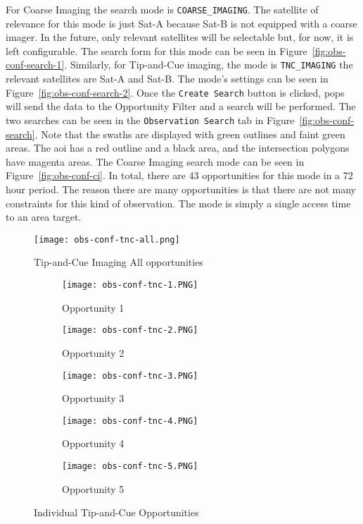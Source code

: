 For Coarse Imaging the search mode is \texttt{COARSE\_IMAGING}.  The satellite
of relevance for this mode is just Sat-A because Sat-B is not equipped with a
coarse imager. In the future, only relevant satellites will be selectable but,
for now, it is left configurable.  The search form for this mode can be seen in
Figure~\ref{fig:obs-conf-search-1}. Similarly, for Tip-and-Cue imaging, the
mode is \texttt{TNC\_IMAGING} the relevant satellites are Sat-A and Sat-B.  The
mode's settings can be seen in Figure~\ref{fig:obs-conf-search-2}. Once the
\texttt{Create Search} button is clicked, \gls{pops} will send the data to the
Opportunity Filter and a search will be performed. The two searches can be seen
in the \texttt{Observation Search} tab in Figure~\ref{fig:obs-conf-search}.
Note that the swaths are displayed with green outlines and faint green areas.
The \gls{aoi} has a red outline and a black area, and the intersection polygons
have magenta areas. The Coarse Imaging search mode can be seen in
Figure~\ref{fig:obs-conf-ci}. In total, there are 43 opportunities for this
mode in a 72 hour period. The reason there are many opportunities is that there
are not many constraints for this kind of observation. The mode is simply a
single access time to an area target. 

\begin{figure}[ht]
    \centering
    \texttt{[image: obs-conf-tnc-all.png]} 
    \caption{Tip-and-Cue Imaging All opportunities}
    \label{fig:obs-conf-tnc-all} 
\end{figure}

\begin{figure}
    \centering
    \begin{subfigure}[b]{0.45\textwidth}
	\centering
	\texttt{[image: obs-conf-tnc-1.PNG]} 
	\caption{Opportunity 1}
	\label{fig:obs-conf-tnc-1} 
    \end{subfigure}
    \hfill
    \begin{subfigure}[b]{0.45\textwidth}
	\centering
	\texttt{[image: obs-conf-tnc-2.PNG]} 
	\caption{Opportunity 2}
	\label{fig:obs-conf-tnc-2} 
    \end{subfigure}
    \hfill
    \begin{subfigure}[b]{0.45\textwidth}
	\centering
	\texttt{[image: obs-conf-tnc-3.PNG]} 
	\caption{Opportunity 3}
	\label{fig:obs-conf-tnc-3} 
    \end{subfigure}
    
    \begin{subfigure}[b]{0.45\textwidth}
	\centering
	\texttt{[image: obs-conf-tnc-4.PNG]} 
	\caption{Opportunity 4}
	\label{fig:obs-conf-tnc-4} 
    \end{subfigure}
    \quad \quad
    \begin{subfigure}[b]{0.45\textwidth}
	\centering
	\texttt{[image: obs-conf-tnc-5.PNG]} 
	\caption{Opportunity 5}
	\label{fig:obs-conf-tnc-5} 
    \end{subfigure}

    \caption{Individual Tip-and-Cue Opportunities}
\label{fig:obs-conf-tnc-opps}
\end{figure}


